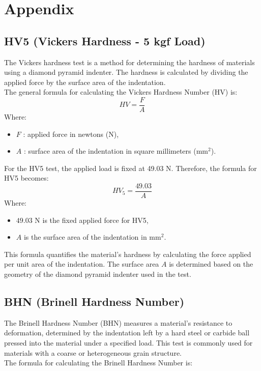 \documentclass{article}
\begin{document}
    \newpage\vspace*{-5pt}
    
   
    
\section{Appendix}
\normalsize
\renewcommand{\thesubsection}{\Alph{subsection}}
\subsection{HV5 (Vickers Hardness - 5 kgf Load)}
The Vickers hardness test is a method for determining the hardness of materials using a diamond pyramid indenter. The hardness is calculated by dividing the applied force by the surface area of the indentation.\\[1em]
The general formula for calculating the Vickers Hardness Number (HV) is:
\begin{equation}
    HV = \frac{F}{A}
\end{equation}
Where:
\begin{itemize}[itemsep=-1mm]
    \item \( F \) : applied force in newtons (N),
    \item \( A \) : surface area of the indentation in square millimeters (mm\(^2\)).
\end{itemize}
For the HV5 test, the applied load is fixed at 49.03 N. Therefore, the formula for HV5 becomes:
\begin{equation}
    HV_5 = \frac{49.03}{A}
\end{equation}
Where:
\begin{itemize}[itemsep=-1mm]
    \item \( 49.03 \) N is the fixed applied force for HV5,
    \item \( A \) is the surface area of the indentation in mm\(^2\).
\end{itemize}
This formula quantifies the material's hardness by calculating the force applied per unit area of the indentation. The surface area \( A \) is determined based on the geometry of the diamond pyramid indenter used in the test.
\subsection{BHN (Brinell Hardness Number)}
The Brinell Hardness Number (BHN) measures a material's resistance to deformation, determined by the indentation left by a hard steel or carbide ball pressed into the material under a specified load. This test is commonly used for materials with a coarse or heterogeneous grain structure.\\[1em]
The formula for calculating the Brinell Hardness Number is:
\end{document}
